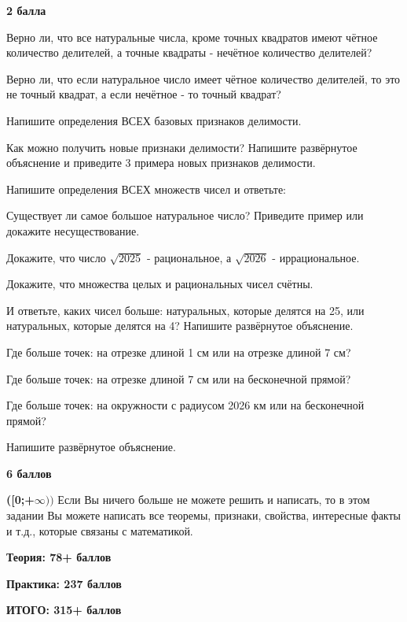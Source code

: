 \begin{flushright} \textbf{2 балла}\\ 
\end{flushright}

\newpage


 Верно ли, что все натуральные числа, кроме точных квадратов имеют чётное количество делителей, а точные квадраты - нечётное количество делителей?

Верно ли, что если натуральное число имеет чётное количество делителей, то это не точный квадрат, а если нечётное - то точный квадрат?

 Напишите определения ВСЕХ базовых признаков делимости. 

 Как можно получить новые признаки делимости? Напишите развёрнутое объяснение и приведите 3 примера новых признаков делимости.

 Напишите определения ВСЕХ множеств чисел и ответьте:

Существует ли самое большое натуральное число? Приведите пример или докажите несуществование.

 Докажите, что число $\sqrt{2025}$ - рациональное, а $\sqrt{2026}$ - иррациональное. 

 Докажите, что множества целых и рациональных чисел счётны.

И ответьте, каких чисел больше: натуральных, которые делятся на 25, или натуральных, которые делятся на 4? Напишите развёрнутое объяснение.

 Где больше точек: на отрезке длиной 1 см или на отрезке длиной 7 см? 

Где больше точек: на отрезке длиной 7 см или на бесконечной прямой? 

Где больше точек: на окружности с радиусом 2026 км или на бесконечной прямой?

Напишите развёрнутое объяснение.

\begin{flushright} \textbf{6 баллов}\\ 
\end{flushright}

\textbf{([0;+$\infty))$} Если Вы ничего больше не можете решить и написать, то в этом задании Вы можете написать все теоремы, признаки, свойства, интересные факты и т.д., которые связаны с математикой. 

\centerline{\textbf{Теория: 78+ баллов}}
\centerline{\textbf{Практика: 237 баллов}}
\centerline{\textbf{ИТОГО: 315+ баллов}}


